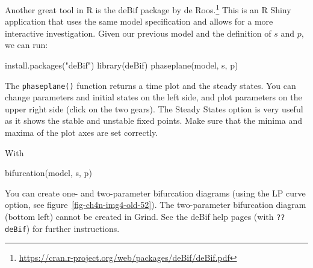 \documentclass[
  a4paper,
  DIV=11,
  numbers=noendperiod,
  oneside]{scrreprt}
\newenvironment{Shaded}{}{}
\newcommand{\FunctionTok}[1]{\textcolor[rgb]{0.44,0.26,0.76}{#1}}
\newcommand{\NormalTok}[1]{\textcolor[rgb]{0.14,0.16,0.18}{#1}}
\newcommand{\StringTok}[1]{\textcolor[rgb]{0.01,0.18,0.38}{#1}}
\begin{document}
Another great tool in R is the deBif package by de Roos.\footnote{\url{https://cran.r-project.org/web/packages/deBif/deBif.pdf}}
This is an R Shiny application that uses the same model specification
and allows for a more interactive investigation. Given our previous
model and the definition of \(s\) and \(p\), we can run:

\begin{Shaded}
\begin{Highlighting}[]
\FunctionTok{install.packages}\NormalTok{(}\StringTok{"deBif"}\NormalTok{)}
\FunctionTok{library}\NormalTok{(deBif)}
\FunctionTok{phaseplane}\NormalTok{(model, s, p)}
\end{Highlighting}
\end{Shaded}

The \texttt{phaseplane()} function returns a time plot and the steady
states. You can change parameters and initial states on the left side,
and plot parameters on the upper right side (click on the two gears).
The Steady States option is very useful as it shows the stable and
unstable fixed points. Make sure that the minima and maxima of the plot
axes are set correctly.

With

\begin{Shaded}
\begin{Highlighting}[]
\FunctionTok{bifurcation}\NormalTok{(model, s, p)}
\end{Highlighting}
\end{Shaded}

You can create one- and two-parameter bifurcation diagrams (using the LP
curve option, see figure~\ref{fig-ch4n-img4-old-52}). The two-parameter
bifurcation diagram (bottom left) cannot be created in Grind. See the
deBif help pages (with \texttt{??deBif}) for further instructions.
\end{document}
